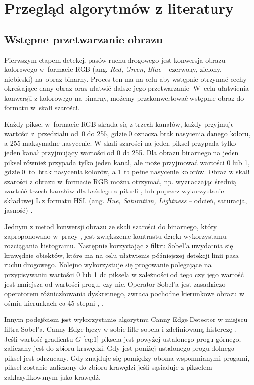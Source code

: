 \chapter{Przegląd algorytmów z literatury}

\section{Wstępne przetwarzanie obrazu}
Pierwszym etapem detekcji pasów ruchu drogowego jest konwersja obrazu kolorowego w~formacie RGB (ang. \textit{Red, Green, Blue} -- czerwony, zielony, niebieski) na~obraz binarny.
Proces ten ma na celu aby wstępnie otrzymać cechy określające dany obraz oraz ułatwić dalsze jego przetwarzanie. W~celu ułatwienia konwersji z kolorowego na binarny, możemy przekonwertować wstępnie obraz do formatu w~skali szarości. 

Każdy piksel w~formacie RGB składa się z trzech kanałów, każdy przyjmuje wartości z~przedziału od~0 do 255, gdzie 0 oznacza brak nasycenia danego koloru, a 255 maksymalne nasycenie.
W skali szarości na jeden piksel przypada tylko jeden kanał przyjmujący wartości od 0 do 255.
Dla obrazu binarnego na jeden piksel również przypada tylko jeden kanał, ale może przyjmować wartości 0 lub 1, gdzie 0~to~brak nasycenia kolorów, a 1 to pełne nasycenie kolorów.
Obraz w skali szarości z obrazu w~formacie RGB można otrzymać, np. wyznaczając średnią wartość trzech kanałów dla każdego z pikseli \cite{4}, lub poprzez wykorzystanie składowej L z formatu HSL (ang. \textit{Hue, Saturation, Lightness} -- odcień, saturacja, jasność) \cite{reichenbach_comparison}.


Jednym z metod konwersji obrazu ze skali szarości do binarnego, który zaproponowano w~pracy \cite{4}, jest zwiększenie kontrastu dzięki wykorzystaniu rozciągania histogramu. Następnie korzystając z filtru Sobel'a uwydatnia się krawędzie obiektów, które ma na celu ułatwienie późniejszej detekcji linii pasa ruchu drogowego. Kolejno wykorzystuje się progowanie polegające na przypisywaniu wartości 0 lub 1 do piksela w zależności od tego czy jego wartość jest mniejsza od wartości progu, czy nie. Operator Sobel'a jest zasadniczo operatorem różniczkowania dyskretnego, zwraca pochodne kierunkowe obrazu w ośmiu kierunkach co 45 stopni \cite{3}, \cite{sobel}.


Innym podejściem \cite{reichenbach_comparison} jest wykorzystanie algorytmu Canny Edge Detector w miejscu filtra Sobel'a. Canny Edge łączy w sobie filtr sobela i zdefiniowaną histerezę \cite{cany}. Jeśli wartość gradientu $G$ \eqref{eq:1} piksela jest powyżej ustalonego progu górnego, zaliczany jest do zbioru krawędzi. Gdy jest poniżej ustalonego progu dolnego piksel jest odrzucany. Gdy znajduje się pomiędzy oboma wspomnianymi progami, piksel zostanie zaliczony do zbioru krawędzi jeśli sąsiaduje z pikselem zaklasyfikowanym jako krawędź.


